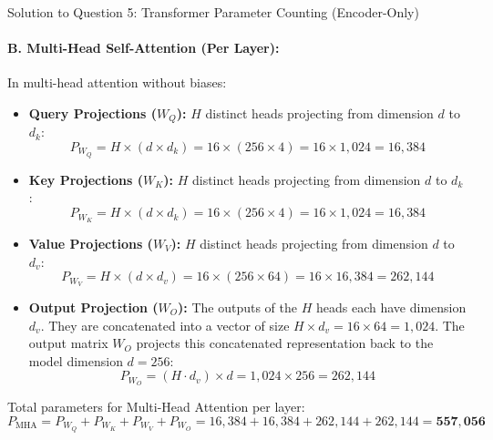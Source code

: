 \documentclass[11pt,a4paper]{article}
\begin{document}
\begin{solutionbox}{Solution to Question 5: Transformer Parameter Counting (Encoder-Only)}
\paragraph{B. Multi-Head Self-Attention (Per Layer):}
In multi-head attention without biases:
\begin{itemize}[noitemsep]
    \item \textbf{Query Projections ($W_Q$):} $H$ distinct heads projecting from dimension $d$ to $d_k$:
    \begin{equation*}
    P_{W_Q} = H \times (d \times d_k) = 16 \times (256 \times 4) = 16 \times 1{,}024 = 16{,}384
    \end{equation*}
    \item \textbf{Key Projections ($W_K$):} $H$ distinct heads projecting from dimension $d$ to $d_k$:
    \begin{equation*}
    P_{W_K} = H \times (d \times d_k) = 16 \times (256 \times 4) = 16 \times 1{,}024 = 16{,}384
    \end{equation*}
    \item \textbf{Value Projections ($W_V$):} $H$ distinct heads projecting from dimension $d$ to $d_v$:
    \begin{equation*}
    P_{W_V} = H \times (d \times d_v) = 16 \times (256 \times 64) = 16 \times 16{,}384 = 262{,}144
    \end{equation*}
    \item \textbf{Output Projection ($W_O$):} The outputs of the $H$ heads each have dimension $d_v$. They are concatenated into a vector of size $H \times d_v = 16 \times 64 = 1{,}024$. The output matrix $W_O$ projects this concatenated representation back to the model dimension $d = 256$:
    \begin{equation*}
    P_{W_O} = (H \cdot d_v) \times d = 1{,}024 \times 256 = 262{,}144
    \end{equation*}
\end{itemize}
Total parameters for Multi-Head Attention per layer:
\begin{equation*}
P_{\text{MHA}} = P_{W_Q} + P_{W_K} + P_{W_V} + P_{W_O} = 16{,}384 + 16{,}384 + 262{,}144 + 262{,}144 = \mathbf{557{,}056}
\end{equation*}


\end{solutionbox}
\end{document}
